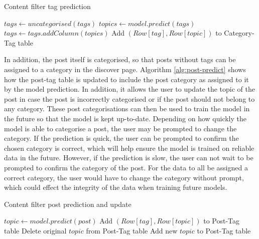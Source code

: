 \begin{algorithm}
\caption{Content filter tag prediction}
\label{alg:content-filter-predict}
\begin{algorithmic}[1]
	\State $tags\gets uncategorised(tags)$
	\State $topics\gets model.predict(tags)$
	\State $tags \gets tags.addColumn(topics)$
		\State Add $(Row[tag],Row[topic])$ to Category-Tag table
	\EndFor
\EndFunction
\end{algorithmic}
\end{algorithm}

In addition, the post itself is categorised, so that posts without tags can be assigned to a category in the discover page. Algorithm \ref{alg:post-predict} shows how the post-tag table is updated to include the post category as assigned to it by the model prediction. In addition, it allows the user to update the topic of the post in case the post is incorrectly categorised or if the post should not belong to any category. These post categorisations can then be used to train the model in the future so that the model is kept up-to-date. Depending on how quickly the model is able to categorise a post, the user may be prompted to change the category. If the prediction is quick, the user can be prompted to confirm the chosen category is correct, which will help ensure the model is trained on reliable data in the future. However, if the prediction is slow, the user can not wait to be prompted to confirm the category of the post. For the data to all be assigned a correct category, the user would have to change the category without prompt, which could effect the integrity of the data when training future models.   

\begin{algorithm}
\caption{Content filter post prediction and update}
\label{alg:post-predict}
\begin{algorithmic}[1]
	\State $topic\gets model.predict(post)$
	\State Add $(Row[tag],Row[topic])$ to Post-Tag table
		Delete original $topic$ from Post-Tag table
		Add new $topic$ to Post-Tag table
	\EndIf
\EndFunction
\end{algorithmic}
\end{algorithm}